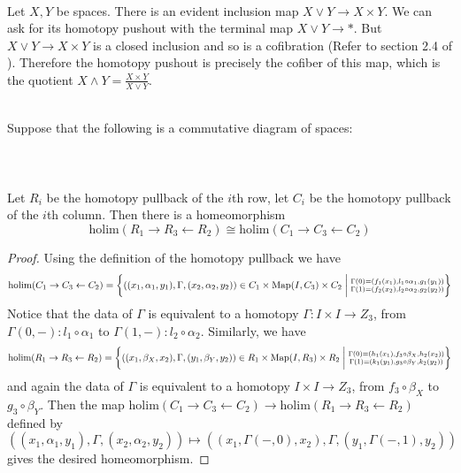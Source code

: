 \documentclass[a4paper]{article}
\begin{document}
\begin{eg}{}{}\\
Let $X,Y$ be spaces. There is an evident inclusion map $X\vee Y\to X\times Y$. We can ask for its homotopy pushout with the terminal map $X\vee Y\to\ast$. But $X\vee Y\to X\times Y$ is a closed inclusion and so is a cofibration (Refer to section 2.4 of \cite{MC}). Therefore the homotopy pushout is precisely the cofiber of this map, which is the quotient $X\wedge Y=\frac{X\times Y}{X\vee Y}$. 
\end{eg}

\begin{prp}{}{}\\
Suppose that the following is a commutative diagram of spaces:  
 \\~\\  \\~\\
Let $R_i$ be the homotopy pullback of the $i$th row, let $C_i$ be the homotopy pullback of the $i$th column. Then there is a homeomorphism $$\text{holim}(R_1\rightarrow R_3\leftarrow R_2)\cong\text{holim}(C_1\rightarrow C_3\leftarrow C_2)$$ 
\begin{proof}
Using the definition of the homotopy pullback we have $$\text{holim}(C_1\rightarrow C_3\leftarrow C_2)=\left\{((x_1,\alpha_1,y_1),\Gamma,(x_2,\alpha_2,y_2))\in C_1\times\text{Map}(I,C_3)\times C_2\;\bigg{|}\;\substack{\Gamma(0)=(f_1(x_1),l_1\circ\alpha_1,g_1(y_1))\\\Gamma(1)=(f_2(x_2),l_2\circ\alpha_2,g_2(y_2))}\right\}$$ Notice that the data of $\Gamma$ is equivalent to a homotopy $\Gamma:I\times I\to Z_3$, from $\Gamma(0,-):l_1\circ\alpha_1$ to $\Gamma(1,-):l_2\circ\alpha_2$. Similarly, we have $$\text{holim}(R_1\rightarrow R_3\leftarrow R_2)=\left\{((x_1,\beta_X,x_2),\Gamma,(y_1,\beta_Y,y_2))\in R_1\times\text{Map}(I,R_3)\times R_2\;\bigg{|}\;\substack{\Gamma(0)=(h_1(x_1),f_3\circ\beta_X,h_2(x_2))\\\Gamma(1)=(k_1(y_1),g_3\circ\beta_Y,k_2(y_2))}\right\}$$ and again the data of $\Gamma$ is equivalent to a homotopy $I\times I\to Z_3$, from $f_3\circ\beta_X$ to $g_3\circ\beta_Y$. Then the map $\text{holim}(C_1\rightarrow C_3\leftarrow C_2)\to\text{holim}(R_1\rightarrow R_3\leftarrow R_2)$ defined by $$((x_1,\alpha_1,y_1),\Gamma,(x_2,\alpha_2,y_2))\mapsto((x_1,\Gamma(-,0),x_2),\Gamma,(y_1,\Gamma(-,1),y_2))$$ gives the desired homeomorphism. 
\end{proof}
\end{prp}
\end{document}
